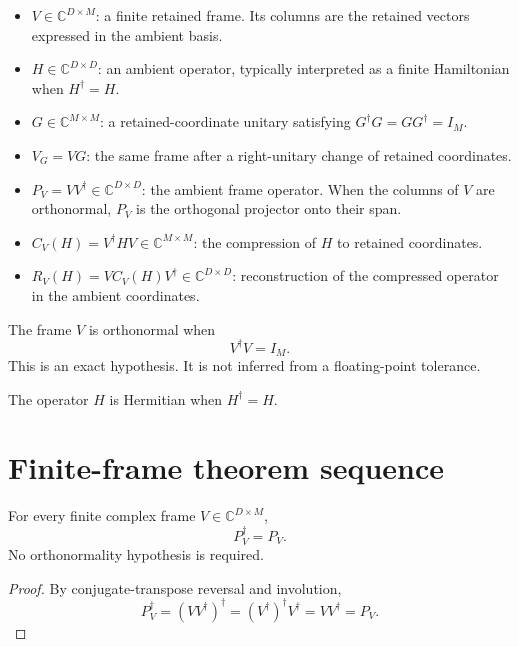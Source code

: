 \begin{itemize}
  \item $V\in\mathbb C^{D\times M}$: a finite retained frame. Its columns are the
        retained vectors expressed in the ambient basis.
  \item $H\in\mathbb C^{D\times D}$: an ambient operator, typically interpreted as a
        finite Hamiltonian when $H^\dagger=H$.
  \item $G\in\mathbb C^{M\times M}$: a retained-coordinate unitary satisfying
        $G^\dagger G=GG^\dagger=I_M$.
  \item $V_G=VG$: the same frame after a right-unitary change of retained coordinates.
  \item $P_V=VV^\dagger\in\mathbb C^{D\times D}$: the ambient frame operator. When the
        columns of $V$ are orthonormal, $P_V$ is the orthogonal projector onto their
        span.
  \item $C_V(H)=V^\dagger HV\in\mathbb C^{M\times M}$: the compression of $H$ to
        retained coordinates.
  \item $R_V(H)=V C_V(H)V^\dagger\in\mathbb C^{D\times D}$: reconstruction of the
        compressed operator in the ambient coordinates.
\end{itemize}

\begin{definition}
The frame $V$ is orthonormal when
\[
  V^\dagger V=I_M.
\]
This is an exact hypothesis. It is not inferred from a floating-point tolerance.
\end{definition}

\begin{definition}
The operator $H$ is Hermitian when $H^\dagger=H$.
\end{definition}

\section{Finite-frame theorem sequence}

\begin{theorem}
\label{thm:bg-alignment-001}
For every finite complex frame $V\in\mathbb C^{D\times M}$,
\[
  P_V^\dagger=P_V.
\]
No orthonormality hypothesis is required.
\end{theorem}

\begin{proof}
By conjugate-transpose reversal and involution,
\[
  P_V^\dagger=(VV^\dagger)^\dagger
  =(V^\dagger)^\dagger V^\dagger
  =VV^\dagger=P_V.
\]
\end{proof}

